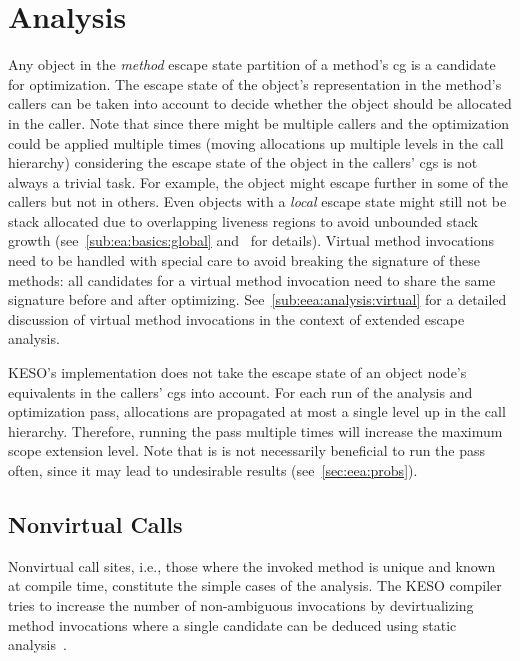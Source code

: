 	\section{Analysis}
		\label{sec:eea:analysis}
		Any object in the \emph{method} escape state partition of a method's \gls{cg} is a candidate for optimization. The
		escape state of the object's representation in the method's callers can be taken into account to decide whether the
		object should be allocated in the caller. Note that since there might be multiple callers and the optimization could
		be applied multiple times (moving allocations up multiple levels in the call hierarchy) considering the escape state
		of the object in the callers' \glspl{cg} is not always a trivial task. For example, the object might escape further
		in some of the callers but not in others. Even objects with a \emph{local} escape state might still not be stack
		allocated due to overlapping liveness regions to avoid unbounded stack growth (see~\cref{sub:ea:basics:global}
		and~\cite[Sec.~3.3]{lang:12} for details). Virtual method invocations need to be handled with special care to avoid
		breaking the signature of these methods: all candidates for a virtual method invocation need to share the same
		signature before and after optimizing. See~\cref{sub:eea:analysis:virtual} for a detailed discussion of virtual
		method invocations in the context of extended escape analysis.

		KESO's implementation does not take the escape state of an object node's equivalents in the callers' \glspl{cg} into
		account. For each run of the analysis and optimization pass, allocations are propagated at most a single level up in
		the call hierarchy. Therefore, running the pass multiple times will increase the maximum scope extension level. Note
		that is is not necessarily beneficial to run the pass often, since it may lead to undesirable results
		(see~\cref{sec:eea:probs}).


		\subsection{Nonvirtual Calls}
			\label{sub:eea:analysis:nonvirtual}
			Nonvirtual call sites, i.e., those where the invoked method is unique and known at compile time, constitute the
			simple cases of the analysis. The KESO compiler tries to increase the number of non-ambiguous invocations by
			devirtualizing method invocations where a single candidate can be deduced using static
			analysis~\cite[Sec.~3.4]{erhardt:11:jtres}.

